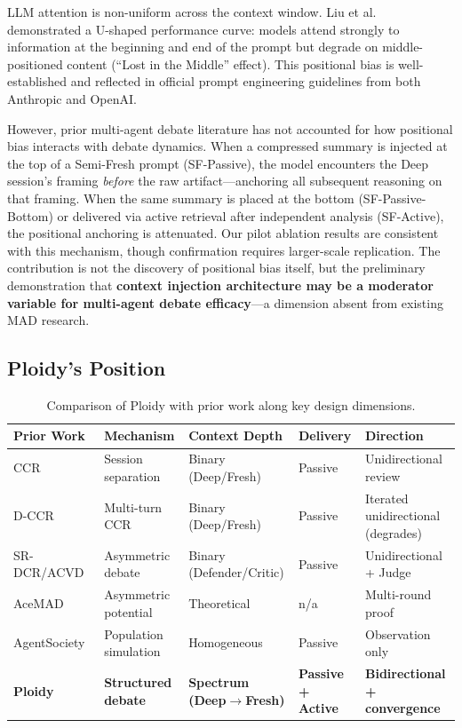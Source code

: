 \documentclass[11pt]{article}
\begin{document}
LLM attention is non-uniform across the context window. Liu et al.~\citep{liu2023lost} demonstrated a U-shaped performance curve: models attend strongly to information at the beginning and end of the prompt but degrade on middle-positioned content (``Lost in the Middle'' effect). This positional bias is well-established and reflected in official prompt engineering guidelines from both Anthropic and OpenAI.

However, prior multi-agent debate literature has not accounted for how positional bias interacts with debate dynamics. When a compressed summary is injected at the top of a Semi-Fresh prompt (SF-Passive), the model encounters the Deep session's framing \emph{before} the raw artifact---anchoring all subsequent reasoning on that framing. When the same summary is placed at the bottom (SF-Passive-Bottom) or delivered via active retrieval after independent analysis (SF-Active), the positional anchoring is attenuated. Our pilot ablation results are consistent with this mechanism, though confirmation requires larger-scale replication. The contribution is not the discovery of positional bias itself, but the preliminary demonstration that \textbf{context injection architecture may be a moderator variable for multi-agent debate efficacy}---a dimension absent from existing MAD research.

\subsection{Ploidy's Position}
\label{sec:position}

\begin{table}[t]
\centering
\caption{Comparison of Ploidy with prior work along key design dimensions.}
\label{tab:prior-work}
\footnotesize
\setlength{\tabcolsep}{4pt}
\begin{tabular}{@{}p{3.2cm}p{2.4cm}p{3cm}p{2.2cm}p{3cm}@{}}
\toprule
\textbf{Prior Work} & \textbf{Mechanism} & \textbf{Context Depth} & \textbf{Delivery} & \textbf{Direction} \\
\midrule
CCR~\citep{song2026ccr} & Session separation & Binary (Deep/Fresh) & Passive & Unidirectional review \\[3pt]
D-CCR~\citep{song2026dccr} & Multi-turn CCR & Binary (Deep/Fresh) & Passive & Iterated unidirectional (degrades) \\[3pt]
SR-DCR/ACVD~\citep{srdcr2025} & Asymmetric debate & Binary (Defender/Critic) & Passive & Unidirectional + Judge \\[3pt]
AceMAD~\citep{liu2026acemad} & Asymmetric potential & Theoretical & n/a & Multi-round proof \\[3pt]
AgentSociety~\citep{pang2025agentsociety} & Population simulation & Homogeneous & Passive & Observation only \\[3pt]
\textbf{Ploidy} & \textbf{Structured debate} & \textbf{Spectrum (Deep$\to$Fresh)} & \textbf{Passive + Active} & \textbf{Bidirectional + convergence} \\
\bottomrule
\end{tabular}
\end{table}
\end{document}
